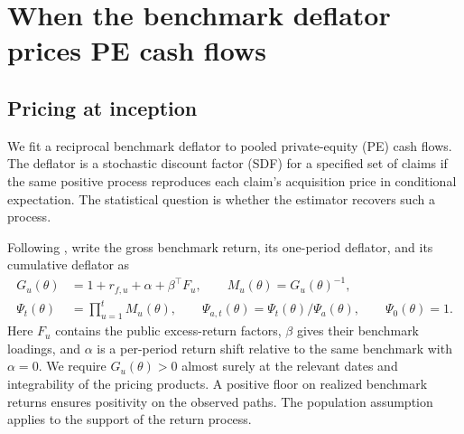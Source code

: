 \section{When the benchmark deflator prices PE cash flows}
\label{sec:appendix_sdf}

\subsection{Pricing at inception}

We fit a reciprocal benchmark deflator to pooled private-equity (PE) cash flows. The deflator is a stochastic discount factor (SDF) for a specified set of claims if the same positive process reproduces each claim's acquisition price in conditional expectation. The statistical question is whether the estimator recovers such a process.

Following \citet{DLP12}, write the gross benchmark return, its one-period deflator, and its cumulative deflator as
\begin{align*}
 G_u(\theta)&=1+r_{f,u}+\alpha+\beta^\top F_u,\qquad
 M_u(\theta)=G_u(\theta)^{-1},\\
 \Psi_t(\theta)&=\prod_{u=1}^t M_u(\theta),\qquad
 \Psi_{a,t}(\theta)=\Psi_t(\theta)/\Psi_a(\theta),\qquad \Psi_0(\theta)=1 .
\end{align*}
Here $F_u$ contains the public excess-return factors, $\beta$ gives their benchmark loadings, and $\alpha$ is a per-period return shift relative to the same benchmark with $\alpha=0$. We require $G_u(\theta)>0$ almost surely at the relevant dates and integrability of the pricing products. A positive floor on realized benchmark returns ensures positivity on the observed paths. The population assumption applies to the support of the return process.

